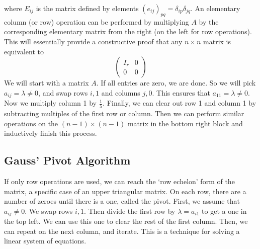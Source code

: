 where \( E_{ij} \) is the matrix defined by elements \( (e_{ij})_{pq} = \delta_{ip} \delta_{jq} \).
An elementary column (or row) operation can be performed by multiplying \( A \) by the corresponding elementary matrix from the right (on the left for row operations).
This will essentially provide a constructive proof that any \( n \times n \) matrix is equivalent to
\[
	\begin{pmatrix} I_r & 0 \\ 0 & 0 \end{pmatrix}
\]
We will start with a matrix \( A \).
If all entries are zero, we are done.
So we will pick \( a_{ij} = \lambda \neq 0 \), and swap rows \( i,1 \) and columns \( j,0 \).
This ensures that \( a_{11} = \lambda \neq 0 \).
Now we multiply column 1 by \( \frac{1}{\lambda} \).
Finally, we can clear out row 1 and column 1 by subtracting multiples of the first row or column.
Then we can perform similar operations on the \( (n-1)\times(n-1) \) matrix in the bottom right block and inductively finish this process.

\subsection{Gauss' Pivot Algorithm}
If only row operations are used, we can reach the `row echelon' form of the matrix, a specific case of an upper triangular matrix.
On each row, there are a number of zeroes until there is a one, called the pivot.
First, we assume that \( a_{ij} \neq 0 \).
We swap rows \( i, 1 \).
Then divide the first row by \( \lambda = a_{i1} \) to get a one in the top left.
We can use this one to clear the rest of the first column.
Then, we can repeat on the next column, and iterate.
This is a technique for solving a linear system of equations.

